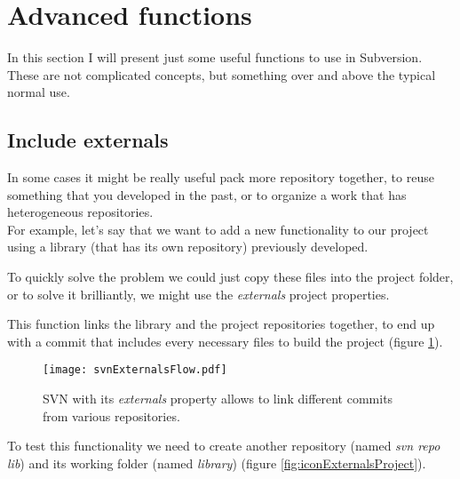 \section{Advanced functions}
\label{section:AdvancedFunctions}

In this section I will present just some useful functions to use in Subversion. These are not complicated concepts, but something over and above the typical normal use.






\subsection{Include externals}
\label{subsection:externals}

In some cases it might be really useful pack more repository together, to reuse something that you developed in the past, or to organize a work that has heterogeneous repositories.\\

For example, let's say that we want to add a new functionality to our project using a library (that has its own repository) previously developed.

To quickly solve the problem we could just copy these files into the project folder, or to solve it brilliantly, we might use the \textit{externals} project properties.


This function links the library and the project repositories together, to end up with a commit that includes every necessary files to build the project (figure \ref{fig:svnExternalsFlow}).\\






\begin{figure}[htbp]
    \centering
    \texttt{[image: svnExternalsFlow.pdf]}
    \caption{SVN with its \textit{externals} property allows to link different commits from various repositories.}
    \label{fig:svnExternalsFlow}
\end{figure}







To test this functionality we need to create another repository (named \textit{svn repo lib}) and its working folder (named \textit{library}) (figure \ref{fig:iconExternalsProject}).





